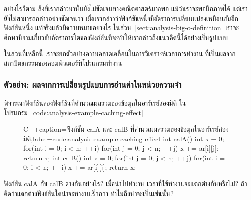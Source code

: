 อย่างไรก็ตาม สิ่ง{\wbr}ที่{\wbr}เรา{\wbr}กล่าว{\wbr}มา{\wbr}นั้น{\wbr}ยัง{\wbr}ไม่{\wbr}ชัดเจน{\wbr}ทาง{\wbr}คณิตศาสตร์{\wbr}มาก{\wbr}พอ แม้ว่า{\wbr}เรา{\wbr}จะ{\wbr}พอ{\wbr}นึก{\wbr}ภาพ{\wbr}ได้{\wbr}
แต่{\wbr}เรา{\wbr}ยัง{\wbr}ไม่{\wbr}สามารถ{\wbr}กล่าว{\wbr}อย่าง{\wbr}ชัดเจน{\wbr}ว่า{\wbr}
เมื่อ{\wbr}เรา{\wbr}กล่าว{\wbr}ว่า{\wbr}ฟังก์ชัน{\wbr}หนึ่ง{\wbr}มี{\wbr}อัตรา{\wbr}การ{\wbr}เปลี่ยนแปลง{\wbr}เหมือน{\wbr}กับ{\wbr}อีก{\wbr}ฟังก์ชัน{\wbr}หนึ่ง{\wbr}
แท้จริง{\wbr}แล้ว{\wbr}มี{\wbr}ความหมาย{\wbr}อย่างไร ใน{\wbr}ส่วน~\ref{sect:analysis-big-o-definition}
เรา{\wbr}จะ{\wbr}ศึกษา{\wbr}นิยาม{\wbr}เกี่ยวกับ{\wbr}อัตรา{\wbr}การ{\wbr}โต{\wbr}ของ{\wbr}ฟังก์ชัน{\wbr}ที่{\wbr}จะ{\wbr}ทำ{\wbr}ให้{\wbr}เรา{\wbr}กล่าว{\wbr}ถึง{\wbr}แนว{\wbr}คิด{\wbr}นี้{\wbr}ได้{\wbr}อย่าง{\wbr}เป็น{\wbr}รูปแบบ{\wbr}

ใน{\wbr}ส่วน{\wbr}ที่{\wbr}เหลือ{\wbr}นี้ เรา{\wbr}จะ{\wbr}ยก{\wbr}ตัวอย่าง{\wbr}ความ{\wbr}คลาดเคลื่อน{\wbr}ใน{\wbr}การ{\wbr}วิเคราะห์{\wbr}เวลา{\wbr}การ{\wbr}ทำงาน{\wbr}
ที่{\wbr}เป็น{\wbr}ผล{\wbr}จาก{\wbr}สถาปัตยกรรม{\wbr}ของ{\wbr}คอมพิวเตอร์{\wbr}ที่{\wbr}โปรแกรม{\wbr}ทำงาน{\wbr}

\subsubsection{ตัวอย่าง: ผล{\wbr}จาก{\wbr}การ{\wbr}เปลี่ยน{\wbr}รูปแบบ{\wbr}การ{\wbr}อ่าน{\wbr}ค่า{\wbr}ใน{\wbr}หน่วยความจำ}

พิจารณา{\wbr}ฟังก์ชัน{\wbr}สอง{\wbr}ฟังก์ชัน{\wbr}ที่{\wbr}คำนวณ{\wbr}ผลรวม{\wbr}ของ{\wbr}ข้อมูล{\wbr}ใน{\wbr}อาร์เรย์{\wbr}สอง{\wbr}มิติ{\wbr}
ใน{\wbr}โปรแกรม~\ref{code:analysis-example-caching-effect}

\begin{figure}
\latintext
\begin{codelist}{C++}{caption={\thaitext ฟังก์ชัน {\ct calA} และ {\ct calB} ที่{\wbr}คำนวณ{\wbr}ผลรวม{\wbr}ของ{\wbr}ข้อมูล{\wbr}ใน{\wbr}อาร์เรย์{\wbr}สอง{\wbr}มิติ\latintext},label=code:analysis-example-caching-effect}
int calA()
{
  int x = 0;
  for(int i = 0; i < n; ++i)
    for(int j = 0; j < n; ++j)
      x += ar[i][j];
  return x;
}
int calB()
{
  int x = 0;
  for(int j = 0; j < n; ++j)
    for(int i = 0; i < n; ++i)
      x += ar[i][j];
  return x;
}
\end{codelist}
\thaitext
\end{figure}

\begin{quiz}{}
ฟังก์ชัน {\ct calA} กับ {\ct calB} ต่าง{\wbr}กัน{\wbr}อย่างไร?  เมื่อ{\wbr}นำ{\wbr}ไป{\wbr}ทำงาน{\wbr}
เวลา{\wbr}ที่{\wbr}ใช้{\wbr}ทำงาน{\wbr}จะ{\wbr}แตกต่าง{\wbr}กัน{\wbr}หรือ{\wbr}ไม่?  ถ้า{\wbr}คิด{\wbr}ว่า{\wbr}แตกต่าง{\wbr}ฟังก์ชัน{\wbr}ใด{\wbr}น่าจะ{\wbr}ทำงาน{\wbr}เร็ว{\wbr}กว่า{\wbr}
ทำไม{\wbr}ถึง{\wbr}น่าจะ{\wbr}เป็น{\wbr}เช่นนั้น?
\end{quiz}

